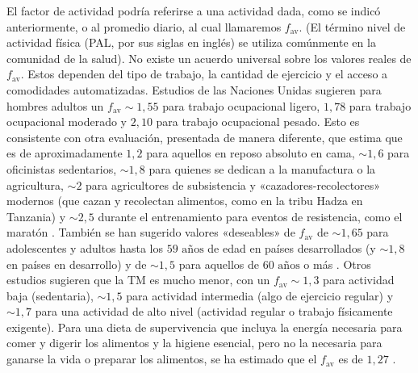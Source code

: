 \documentclass[12pt]{book}
\begin{document}
El factor de actividad podría referirse a una actividad dada, como se indicó anteriormente, o al promedio diario, al cual llamaremos $f_{\text{av}}$. (El término nivel de actividad física (PAL, por sus siglas en inglés) se utiliza comúnmente en la comunidad de la salud). No existe un acuerdo universal sobre los valores reales de $f_{\text{av}}$. Estos dependen del tipo de trabajo, la cantidad de ejercicio y el acceso a comodidades automatizadas. Estudios de las Naciones Unidas sugieren para hombres adultos un $f_{\text{av}} \sim 1,55$ para trabajo ocupacional ligero, $1,78$ para trabajo ocupacional moderado y $2,10$ para trabajo ocupacional pesado. Esto es consistente con otra evaluación, presentada de manera diferente, que estima que es de aproximadamente $1,2$ para aquellos en reposo absoluto en cama, $\sim 1,6$ para oficinistas sedentarios, $\sim 1,8$ para quienes se dedican a la manufactura o la agricultura, $\sim 2$ para agricultores de subsistencia y «cazadores-recolectores» modernos (que cazan y recolectan alimentos, como en la tribu Hadza en Tanzania) \cite{7} y $\sim 2,5$ durante el entrenamiento para eventos de resistencia, como el maratón \cite{56}. También se han sugerido valores «deseables» de $f_{\text{av}}$ de $\sim 1,65$ para adolescentes y adultos hasta los $59\text{ años}$ de edad en países desarrollados (y $\sim 1,8$ en países en desarrollo) y de $\sim 1,5$ para aquellos de $60\text{ años}$ o más \cite{33,47}. Otros estudios sugieren que la TM es mucho menor, con un $f_{\text{av}} \sim 1,3$ para actividad baja (sedentaria), $\sim 1,5$ para actividad intermedia (algo de ejercicio regular) y $\sim 1,7$ para una actividad de alto nivel (actividad regular o trabajo físicamente exigente). Para una dieta de supervivencia que incluya la energía necesaria para comer y digerir los alimentos y la higiene esencial, pero no la necesaria para ganarse la vida o preparar los alimentos, se ha estimado que el $f_{\text{av}}$ es de $1,27$ \cite{34}.
\end{document}
